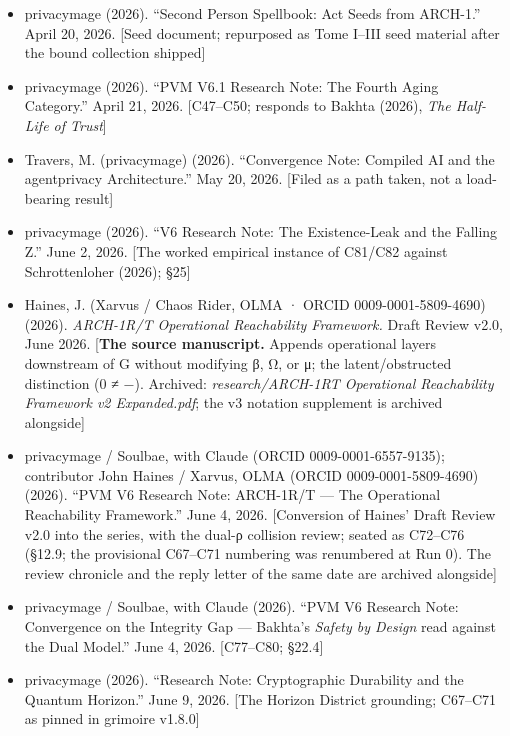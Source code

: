 \documentclass[
]{article}
\begin{document}
\begin{itemize}
  privacymage (2026). ``PVM V6 Research Note: The Wound and the Cap ---
  Convergence at the Bijective Boundary.'' April 18, 2026 (locked-in May
  9). {[}C34--C37{]}
\item
  privacymage (2026). ``Second Person Spellbook: Act Seeds from
  ARCH-1.'' April 20, 2026. {[}Seed document; repurposed as Tome I--III
  seed material after the bound collection shipped{]}
\item
  privacymage (2026). ``PVM V6.1 Research Note: The Fourth Aging
  Category.'' April 21, 2026. {[}C47--C50; responds to Bakhta (2026),
  \emph{The Half-Life of Trust}{]}
\item
  Travers, M. (privacymage) (2026). ``Convergence Note: Compiled AI and
  the agentprivacy Architecture.'' May 20, 2026. {[}Filed as a path
  taken, not a load-bearing result{]}
\item
  privacymage (2026). ``V6 Research Note: The Existence-Leak and the
  Falling Z.'' June 2, 2026. {[}The worked empirical instance of C81/C82
  against Schrottenloher (2026); §25{]}
\item
  Haines, J. (Xarvus / Chaos Rider, OLMA · ORCID 0009-0001-5809-4690)
  (2026). \emph{ARCH-1R/T Operational Reachability Framework.} Draft
  Review v2.0, June 2026. {[}\textbf{The source manuscript.} Appends
  operational layers downstream of G without modifying β, Ω, or μ; the
  latent/obstructed distinction (0 ≠ −). Archived:
  \emph{research/ARCH-1RT Operational Reachability Framework v2
  Expanded.pdf}; the v3 notation supplement is archived alongside{]}
\item
  privacymage / Soulbae, with Claude (ORCID 0009-0001-6557-9135);
  contributor John Haines / Xarvus, OLMA (ORCID 0009-0001-5809-4690)
  (2026). ``PVM V6 Research Note: ARCH-1R/T --- The Operational
  Reachability Framework.'' June 4, 2026. {[}Conversion of Haines' Draft
  Review v2.0 into the series, with the dual-ρ collision review; seated
  as C72--C76 (§12.9; the provisional C67--C71 numbering was renumbered
  at Run 0). The review chronicle and the reply letter of the same date
  are archived alongside{]}
\item
  privacymage / Soulbae, with Claude (2026). ``PVM V6 Research Note:
  Convergence on the Integrity Gap --- Bakhta's \emph{Safety by Design}
  read against the Dual Model.'' June 4, 2026. {[}C77--C80; §22.4{]}
\item
  privacymage (2026). ``Research Note: Cryptographic Durability and the
  Quantum Horizon.'' June 9, 2026. {[}The Horizon District grounding;
  C67--C71 as pinned in grimoire v1.8.0{]}
\end{itemize}
\end{document}
